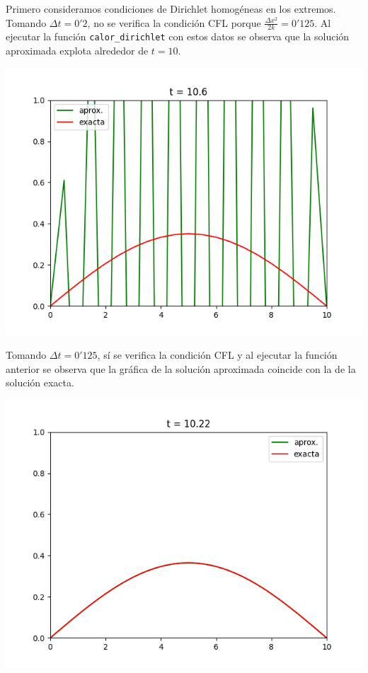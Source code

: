 \documentclass[a4paper, 12pt, oneside]{report}
\begin{document}
Primero consideramos condiciones de Dirichlet homogéneas en los extremos. Tomando $\Delta t = 0'2$, no se verifica la condición CFL porque $\frac{\Delta x^2}{2k} = 0'125$. Al ejecutar la función \texttt{calor\_dirichlet} con estos datos se observa que la solución aproximada explota alrededor de $t = 10$.
\begin{center}
    \includegraphics[scale = 0.8]{./images/Figure_1.png}
\end{center}
Tomando $\Delta t = 0'125$, sí se verifica la condición CFL y al ejecutar la función anterior se observa que la gráfica de la solución aproximada coincide con la de la solución exacta.
\begin{center}
    \includegraphics[scale = 0.8]{./images/Figure_2.png}
\end{center}
\end{document}
